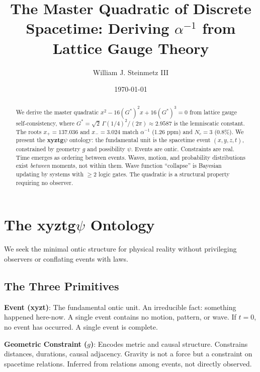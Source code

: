 \documentclass[aps,prl,twocolumn,showpacs,superscriptaddress,groupedaddress]{revtex4-2}
\begin{document}
\title{The Master Quadratic of Discrete Spacetime: Deriving $\alpha^{-1}$ from Lattice Gauge Theory}

\author{William J. Steinmetz III}

\date{\today}

\begin{abstract}
We derive the master quadratic $x^2 - 16(G^*)^2 x + 16(G^*)^3 = 0$ from lattice gauge self-consistency, where $G^* = \sqrt{2}\,\Gamma(1/4)^2/(2\pi) \approx 2.9587$ is the lemniscatic constant. The roots $x_+ = 137.036$ and $x_- = 3.024$ match $\alpha^{-1}$ (1.26 ppm) and $N_c = 3$ (0.8\%). We present the \textbf{xyztg$\psi$} ontology: the fundamental unit is the spacetime event $(x,y,z,t)$, constrained by geometry $g$ and possibility $\psi$. Events are ontic. Constraints are real. Time emerges as ordering between events. Waves, motion, and probability distributions exist \textit{between} moments, not within them. Wave function ``collapse'' is Bayesian updating by systems with $\geq 2$ logic gates. The quadratic is a structural property requiring no observer.
\end{abstract}

\maketitle

\section{The xyztg$\psi$ Ontology}

We seek the minimal ontic structure for physical reality without privileging observers or conflating events with laws.

\subsection{The Three Primitives}

\textbf{Event (xyzt)}: The fundamental ontic unit. An irreducible fact: something happened here-now. A single event contains no motion, pattern, or wave. If $t = 0$, no event has occurred. A single event is complete.

\textbf{Geometric Constraint ($g$)}: Encodes metric and causal structure. Constrains distances, durations, causal adjacency. Gravity is not a force but a constraint on spacetime relations. Inferred from relations among events, not directly observed.
\end{document}
